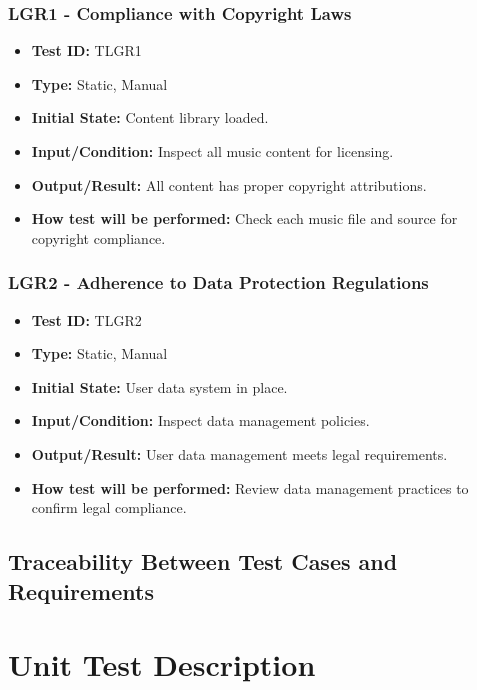 \documentclass[12pt, titlepage]{article}
\begin{document}
\subsubsection{LGR1 - Compliance with Copyright Laws}
\begin{itemize}
    \item \textbf{Test ID:} TLGR1
    \item \textbf{Type:} Static, Manual
    \item \textbf{Initial State:} Content library loaded.
    \item \textbf{Input/Condition:} Inspect all music content for licensing.
    \item \textbf{Output/Result:} All content has proper copyright attributions.
    \item \textbf{How test will be performed:} Check each music file and source for copyright compliance.
\end{itemize}

\subsubsection{LGR2 - Adherence to Data Protection Regulations}
\begin{itemize}
    \item \textbf{Test ID:} TLGR2
    \item \textbf{Type:} Static, Manual
    \item \textbf{Initial State:} User data system in place.
    \item \textbf{Input/Condition:} Inspect data management policies.
    \item \textbf{Output/Result:} User data management meets legal requirements.
    \item \textbf{How test will be performed:} Review data management practices to confirm legal compliance.
\end{itemize}

\subsection{Traceability Between Test Cases and Requirements}


\section{Unit Test Description}
\renewcommand{\authornote}[3]{} %
\end{document}
